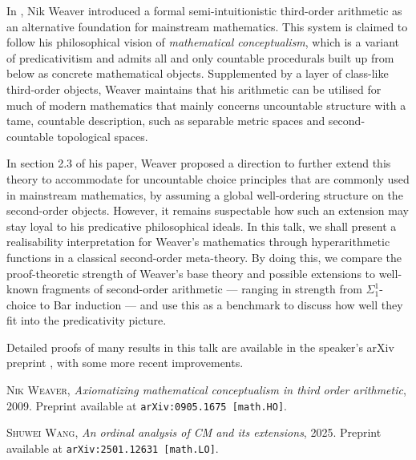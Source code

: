 \documentclass[bsl,meeting]{asl}
\newcommand{\NP}{}
\begin{document}
\thispagestyle{empty}

\NP
{}

In \cite{weaver09-cm}, Nik Weaver introduced a formal semi-intuitionistic third-order arithmetic as an alternative foundation for mainstream mathematics. This system is claimed to follow his philosophical vision of \emph{mathematical conceptualism}, which is a variant of predicativitism and admits all and only countable procedurals built up from below as concrete mathematical objects. Supplemented by a layer of class-like third-order objects, Weaver maintains that his arithmetic can be utilised for much of modern mathematics that mainly concerns uncountable structure with a tame, countable description, such as separable metric spaces and second-countable topological spaces.

In section 2.3 of his paper, Weaver proposed a direction to further extend this theory to accommodate for uncountable choice principles that are commonly used in mainstream mathematics, by assuming a global well-ordering structure on the second-order objects. However, it remains suspectable how such an extension may stay loyal to his predicative philosophical ideals. In this talk, we shall present a realisability interpretation for Weaver's mathematics through hyperarithmetic functions in a classical second-order meta-theory. By doing this, we compare the proof-theoretic strength of Weaver's base theory and possible extensions to well-known fragments of second-order arithmetic --- ranging in strength from $\Sigma^1_1$-choice to Bar induction --- and use this as a benchmark to discuss how well they fit into the predicativity picture.

Detailed proofs of many results in this talk are available in the speaker's arXiv preprint \cite{wang-sw25-cm}, with some more recent improvements.

\begin{thebibliography}{10}

  {\scshape Nik Weaver},
  {\itshape Axiomatizing mathematical conceptualism in third order arithmetic}, 2009.
  Preprint available at \texttt{arXiv:0905.1675 [math.HO]}.

  {\scshape Shuwei Wang},
  {\itshape An ordinal analysis of CM and its extensions}, 2025.
  Preprint available at \texttt{arXiv:2501.12631 [math.LO]}.

\end{thebibliography}

\vspace*{-0.5\baselineskip}
\end{document}
